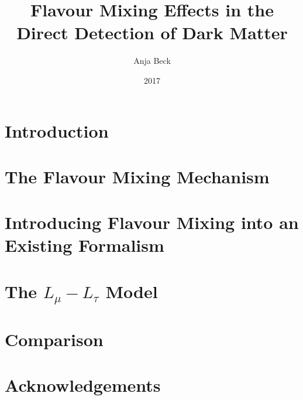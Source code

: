 \documentclass[
  tucolor,
  BCOR=12mm,     %
  parskip=half,  %
  open=any,      %
  cleardoublepage=plain,  %
]{tudothesis}
\author{Anja Beck}
\title{Flavour Mixing Effects in the Direct Detection of Dark Matter}
\date{2017}
\begin{document}
\frontmatter
%
\maketitle

\makecorrectorpage


\cleardoublepage
\tableofcontents

\mainmatter
\chapter{Introduction}

\chapter{The Flavour Mixing Mechanism}

\chapter{Introducing Flavour Mixing into an Existing Formalism\label{sec:formalism}}

\chapter{The \texorpdfstring{$L_\mu-L_\tau$}{TEXT} Model\label{sec:NewInt}}

\chapter{Comparison}

%

\chapter*{Acknowledgements}

\todos
\cleardoublepage
\backmatter
\printbibliography

\cleardoublepage

\end{document}
